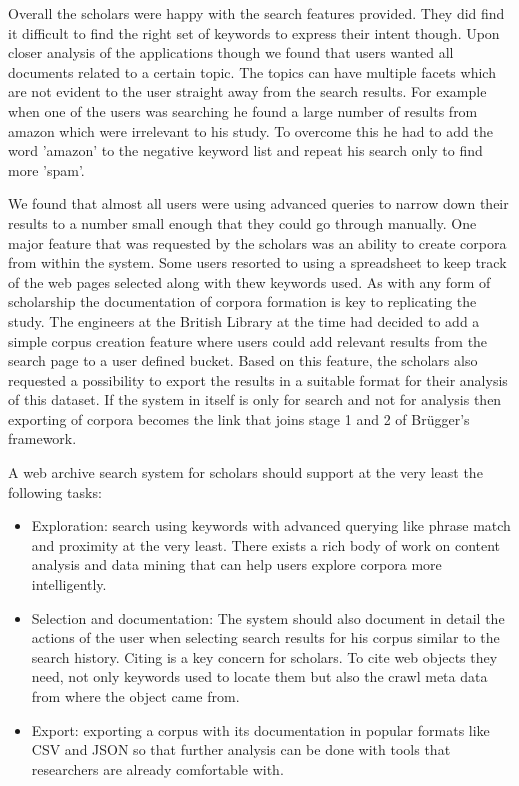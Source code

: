 Overall the scholars were happy with the search features provided. They did find it difficult to find the right set of keywords to express their intent though. Upon closer analysis of the applications though we found that users wanted all documents related to a certain topic. The topics can have multiple facets which are not evident to the user straight away from the search results. For example when one of the users was searching he found a large number of results from amazon which were irrelevant to his study. To overcome this he had to add the word 'amazon' to the negative keyword list and repeat his search only to find more 'spam'. 

We found that almost all users were using advanced queries to narrow down their results to a number small enough that they could go through manually. One major feature that was requested by the scholars was an ability to create corpora from within the system. Some users resorted to using a spreadsheet to keep track of the web pages selected along with thew keywords used. As with any form of scholarship the documentation of corpora formation is key to replicating the study. The engineers at the British Library at the time had decided to add a simple corpus creation feature where users could add relevant results from the search page to a user defined bucket. Based on this feature, the scholars also requested a possibility to export the results in a suitable format for their analysis of this dataset. If the system in itself is only for search and not for analysis then exporting of corpora becomes the link that joins stage 1 and 2 of Br\"ugger's framework. 

A web archive search system for scholars should support at the very least the following tasks:

\begin{itemize}
	\item Exploration: search using keywords with advanced querying like phrase match and proximity at the very least. There exists a rich body of work on content analysis and data mining that can help users explore corpora more intelligently.
	\item Selection and documentation: The system should also document in detail the actions of the user when selecting search results for his corpus similar to the search history. Citing is a key concern for scholars. To cite web objects they need, not only keywords used to locate them but also the crawl meta data from where the object came from.
	\item Export: exporting a corpus with its documentation in popular formats like CSV and JSON so that further analysis can be done with tools that researchers are already comfortable with. 
\end{itemize}

